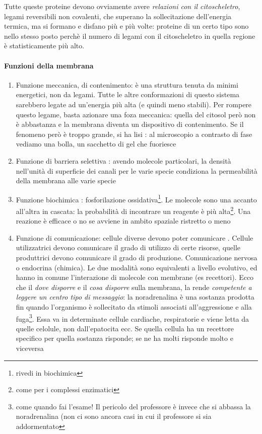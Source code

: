 \documentclass[a4paper,12pt]{article}
\begin{document}
Tutte queste proteine devono ovviamente avere \emph{relazioni con il citoscheletro}, legami reversibili non covalenti, che superano la sollecitazione dell'energia termica, ma si formano e disfano più e più volte: proteine di un certo tipo sono nello stesso posto perchè il numero di legami con il citoscheletro in quella regione è statisticamente più alto.

\paragraph{Funzioni della membrana}
\begin{enumerate}
\item{Funzione meccanica, di contenimento: è una struttura tenuta da minimi energetici, non da legami. Tutte le altre conformazioni di questo sistema sarebbero legate ad un'energia più alta (e quindi meno stabili). Per rompere questo legame, basta azionare una foza meccanica: quella del citosol però non è abbastanza e la membrana diventa un dispositivo di contenimento. Se il fenomeno però è troppo grande, si ha lisi : al microscopio a contrasto di fase vediamo una bolla, un sacchetto di gel che fuoriesce}
\item{Funzione di barriera selettiva : avendo molecole particolari, la densità nell'unità di superficie dei canali per le varie specie condiziona la permeabilità della membrana alle varie specie}
\item{Funzione biochimica : fosforilazione ossidativa\footnote{rivedi in biochimica}. Le molecole sono una accanto all'altra in cascata: la probabilità di incontrare un reagente è più alta\footnote{come per i complessi enzimatici}. Una reazione è efficace o no se avviene in ambito spaziale ristretto o meno}
\item{Funzione di comunicazione: cellule diverse devono poter comunicare . Cellule utilizzatrici devono comunicare il grado di utilizzo di certe risorse, quelle produttrici devono comunicare il grado di produzione.  Comunicazione nervosa o endocrina (chimica). Le due modalità sono equivalenti a livello evolutivo, ed hanno in comune l'interazione di molecole con membrane (es recettori). Ecco che il \emph{dove disporre} e il \emph{cosa disporre} sulla membrana, la rende \emph{competente a leggere un centro tipo di messaggio}: la noradrenalina è una sostanza prodotta fin quando l'organismo è sollecitato da stimoli associati all'aggressione e alla fuga\footnote{come quando fai l'esame! Il pericolo del professore è invece che si abbassa la noradrenalina (non ci sono ancora casi in cui il professore si sia addormentato}. Essa va in determinate cellule cardiache, respiratorie e viene letta da quelle celolule, non dall'epatocita ecc. Se quella cellula ha un recettore specifico per quella sostanza risponde; se ne ha molti risponde molto e viceversa}
\end{enumerate}
\end{document}
